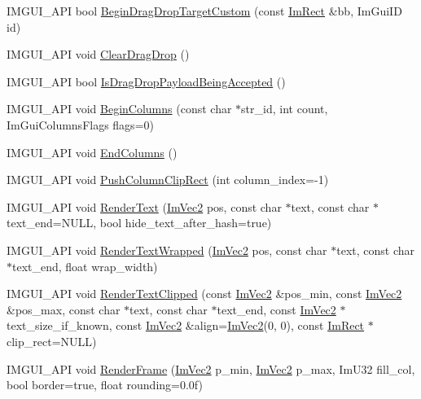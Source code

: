 \begin{DoxyCompactItemize}
\item 
I\+M\+G\+U\+I\+\_\+\+A\+PI bool \hyperlink{namespace_im_gui_a929a420d3af29051a140d0f36addbcd2}{Begin\+Drag\+Drop\+Target\+Custom} (const \hyperlink{struct_im_rect}{Im\+Rect} \&bb, Im\+Gui\+ID id)
\item 
I\+M\+G\+U\+I\+\_\+\+A\+PI void \hyperlink{namespace_im_gui_adae8f94649956a2a717c00dbf81a5df9}{Clear\+Drag\+Drop} ()
\item 
I\+M\+G\+U\+I\+\_\+\+A\+PI bool \hyperlink{namespace_im_gui_a673042a1ed3eeb3c19781faed83ad4a8}{Is\+Drag\+Drop\+Payload\+Being\+Accepted} ()
\item 
I\+M\+G\+U\+I\+\_\+\+A\+PI void \hyperlink{namespace_im_gui_a6992289cbdb087a690403e48340bfb23}{Begin\+Columns} (const char $\ast$str\+\_\+id, int count, Im\+Gui\+Columns\+Flags flags=0)
\item 
I\+M\+G\+U\+I\+\_\+\+A\+PI void \hyperlink{namespace_im_gui_af93bed3bce5475fe4d525d744f16aa20}{End\+Columns} ()
\item 
I\+M\+G\+U\+I\+\_\+\+A\+PI void \hyperlink{namespace_im_gui_abb20c9f8365cab62d9394ebb1dd5d769}{Push\+Column\+Clip\+Rect} (int column\+\_\+index=-\/1)
\item 
I\+M\+G\+U\+I\+\_\+\+A\+PI void \hyperlink{namespace_im_gui_a9971ce57f2a288ac3a12df886c5550d1}{Render\+Text} (\hyperlink{struct_im_vec2}{Im\+Vec2} pos, const char $\ast$text, const char $\ast$text\+\_\+end=N\+U\+LL, bool hide\+\_\+text\+\_\+after\+\_\+hash=true)
\item 
I\+M\+G\+U\+I\+\_\+\+A\+PI void \hyperlink{namespace_im_gui_aa483b40f6899e1b289b4bf6c2673d1d2}{Render\+Text\+Wrapped} (\hyperlink{struct_im_vec2}{Im\+Vec2} pos, const char $\ast$text, const char $\ast$text\+\_\+end, float wrap\+\_\+width)
\item 
I\+M\+G\+U\+I\+\_\+\+A\+PI void \hyperlink{namespace_im_gui_ab362eafae794c7364a6b96ea06f38eb9}{Render\+Text\+Clipped} (const \hyperlink{struct_im_vec2}{Im\+Vec2} \&pos\+\_\+min, const \hyperlink{struct_im_vec2}{Im\+Vec2} \&pos\+\_\+max, const char $\ast$text, const char $\ast$text\+\_\+end, const \hyperlink{struct_im_vec2}{Im\+Vec2} $\ast$text\+\_\+size\+\_\+if\+\_\+known, const \hyperlink{struct_im_vec2}{Im\+Vec2} \&align=\hyperlink{struct_im_vec2}{Im\+Vec2}(0, 0), const \hyperlink{struct_im_rect}{Im\+Rect} $\ast$clip\+\_\+rect=N\+U\+LL)
\item 
I\+M\+G\+U\+I\+\_\+\+A\+PI void \hyperlink{namespace_im_gui_a621ba649568ede3939d4f10d83b86d04}{Render\+Frame} (\hyperlink{struct_im_vec2}{Im\+Vec2} p\+\_\+min, \hyperlink{struct_im_vec2}{Im\+Vec2} p\+\_\+max, Im\+U32 fill\+\_\+col, bool border=true, float rounding=0.\+0f)

\end{DoxyCompactItemize}
